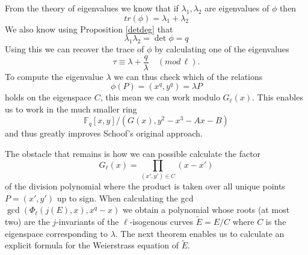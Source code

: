 From the theory of eigenvalues we know that if $\lambda_1, \lambda_2$ are
eigenvalues of $\phi$ then $$tr(\phi) = \lambda_1 + \lambda_2$$
We also know using Proposition \ref{detdeg} that $$\lambda_1 \lambda_2 = \det \phi = q $$
Using this we can recover the trace of $\phi$ by calculating one of the eigenvalues
$$ \tau \equiv \lambda + \frac{q}{\lambda} \quad (mod\, \ell). $$
To compute the eigenvalue $\lambda$ we can thus check which of the relations
$$ \phi(P) = (x^q, y^q) = \lambda P$$
holds on the eigenspace $C$, this mean we can work modulo $G_\ell(x)$. This enables us
to work in the much smaller ring $$\mathbb{F}_q[x,y]/(G(x), y^2 - x^3 - Ax - B) $$
and thus greatly improves Schoof's original approach.

The obstacle that remains is how we can possible calculate the factor 
$$ G_\ell(x) = \prod_{(x',y')\in C} (x-x')$$
of the division polynomial where the product is taken over all 
unique points $P = (x', y')$ up to sign. When calculating the gcd
$\gcd(\Phi_\ell(j(E), x), x^q - x)$ we obtain a polynomial whose roots
(at most two) are the $j$-invariants of the $\ell$-isogenous curves
$\tilde{E} = E/C$ where $C$ is the eigenspace corresponding to $\lambda$.
The next theorem enables us to calculate an explicit formula for the Weierstrass
equation of $\tilde{E}$.

